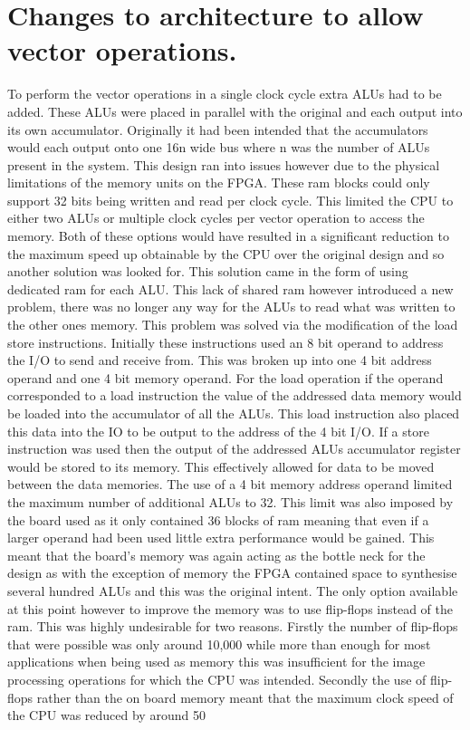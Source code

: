 \section{Changes to architecture to allow vector operations.}

To perform the vector operations in a single clock cycle extra ALUs had to be added. These ALUs were placed in parallel with the original and each output into its own accumulator. Originally it had been intended that the accumulators would each output onto one 16n wide bus where n was the number of ALUs present in the system. This design ran into issues however due to the physical limitations of the memory units on the FPGA. These ram blocks could only support 32 bits being written and read per clock cycle. This limited the CPU to either two ALUs or multiple clock cycles per vector operation to access the memory. Both of these options would have resulted in a significant reduction to the maximum speed up obtainable by the CPU over the original design and so another solution was looked for.
This solution came in the form of using dedicated ram for each ALU. This lack of shared ram however introduced a new problem, there was no longer any way for the ALUs to read what was written to the other ones memory. This problem was solved via the modification of the load store instructions. Initially these instructions used an 8 bit operand to address the I/O to send and receive from. This was broken up into one 4 bit address operand and one 4 bit memory operand. For the load operation if the operand corresponded to a load instruction the value of the addressed data memory would be loaded into the accumulator of all the ALUs. This load instruction also placed this data into the IO to be output to the address of the 4 bit I/O. If a store instruction was used then the output of the addressed ALUs accumulator register would be stored to its memory. This effectively allowed for data to be moved between the data memories. 
The use of a 4 bit memory address operand limited the maximum number of additional ALUs to 32. This limit was also imposed by the board used as it only contained 36 blocks of ram meaning that even if a larger operand had been used little extra performance would be gained. This meant that the board’s memory was again acting as the bottle neck for the design as with the exception of memory the FPGA contained space to synthesise several hundred ALUs and this was the original intent. The only option available at this point however to improve the memory was to use flip-flops instead of the ram. This was highly undesirable for two reasons. Firstly the number of flip-flops that were possible was only around 10,000 while more than enough for most applications when being used as memory this was insufficient for the image processing operations for which the CPU was intended. Secondly the use of flip-flops rather than the on board memory meant that the maximum clock speed of the CPU was reduced by around 50%
